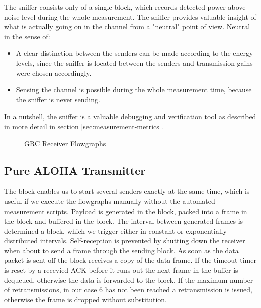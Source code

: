 The sniffer consists only of a single  block, which records detected power above noise level during the whole measurement. The sniffer provides valuable insight of what is actually going on in the channel from a "neutral" point of view. Neutral in the sense of:

\begin{itemize}
	\item A clear distinction between the senders can be made according to the energy levels, since the sniffer is located between the senders and transmission gains were chosen accordingly.
	\item Sensing the channel is possible during the whole measurement time, because the sniffer is never sending.
\end{itemize}

In a nutshell, the sniffer is a valuable debugging and verification tool as described in more detail in section \ref{sec:measurement-metrics}.

\begin{figure}
	\label{fig:grc-receiver}
	\begin{center}
		\vskip 40pt
	\end{center}
	\caption{GRC Receiver Flowgraphs}
\end{figure}

\subsection{Pure ALOHA Transmitter}
The  block enables us to start several senders exactly at the same time, which is useful if we execute the flowgraphs manually without the automated measurement scripts. Payload is generated in the  block, packed into a frame in the  block and buffered in the  block. The interval between generated frames is determined a  block, which we trigger either in constant or exponentially distributed intervals. Self-reception is prevented by shutting down the receiver when about to send a frame through the sending block. As soon as the data packet is sent off the  block receives a copy of the data frame. If the timeout timer is reset by a recevied ACK before it runs out the next frame in the buffer is dequeued, otherwise the data is forwarded to the  block. If the maximum number of retransmissions, in our case 6 has not been reached a retransmission is issued, otherwise the frame is dropped without substitution.

